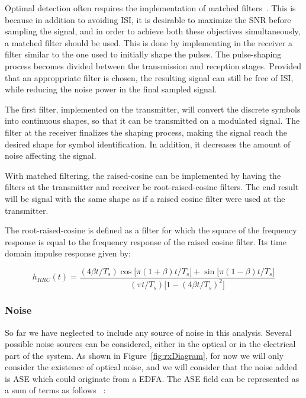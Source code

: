 	Optimal detection often requires the implementation of matched
	filters~\cite{schwartz90}. This is because in addition to avoiding ISI, it is
	desirable to maximize the SNR before sampling the signal, and in order to achieve
	both these objectives simultaneously, a matched filter should be used. This is
	done by
	implementing in the receiver a filter similar to the one used to initially
	shape the pulses. The pulse-shaping process becomes divided between the
	transmission and reception stages. Provided that an approppriate filter is
	chosen, the resulting signal can still be free of ISI, while reducing the
	noise power in the final sampled signal.

	The first filter, implemented on the transmitter, will convert the discrete
	symbols into continuous shapes, so that it can be transmitted on a modulated
	signal. The filter at the receiver finalizes the shaping process, making the
	signal reach the desired shape for symbol identification. In addition, it
	decreases the amount of noise affecting the signal.

	With matched filtering, the raised-cosine can be implemented by having the
	filters at the transmitter and receiver be root-raised-cosine filters.
	The end result will be signal with the same shape as if a raised cosine
	filter were used at the transmitter.

	The root-raised-cosine is defined as a filter for which the square of the
	frequency response is equal to the frequency response of the raised cosine
	filter. Its time domain impulse response
	given by\cite{nguyen09}:

	\begin{equation}\label{eq:rrcTD}
		h_{RRC}(t) = \frac{(4\beta t/T_s)\cos\big[\pi(1+\beta)t/T_s\big] +
		\sin\big[\pi(1-\beta)t/T_s\big]}
		{(\pi t/T_s)\big[1-(4 \beta t/T_s)^2\big]}
	\end{equation}


	\subsubsection{Noise}
	So far we have neglected to include any source of noise in this analysis.
	Several possible noise sources can be considered, either in the optical
	or in the electrical part of the system. As shown in
	Figure~\ref{fig:rxDiagram}, for now we will only consider the existence of
	optical noise,  and we will consider that the noise added is ASE which could
	originate from a EDFA. The ASE field can be represented as a sum of terms as
	follows ~\cite{crognale14, olsson89}:

